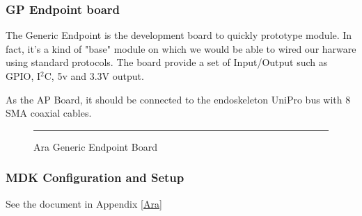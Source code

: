 \subsubsection{GP Endpoint board}

The Generic Endpoint is the development board to quickly prototype module. In fact, it's a kind of "base" module on which we would be able to wired our harware using standard protocols. The board provide a set of Input/Output such as GPIO, I$^2$C, 5v and 3.3V output.

As the AP Board, it should be connected to the endoskeleton UniPro bus with 8 SMA coaxial cables.

\begin{figure}[htbp]
  \centering
    \rule{35em}{0.5pt}
  \caption[Ara Generic Endpoint Board]{Ara Generic Endpoint Board}
  \label{fig:gpendpoint}
\end{figure}

\subsubsection{MDK Configuration and Setup}

See the document in Appendix \ref{Ara}